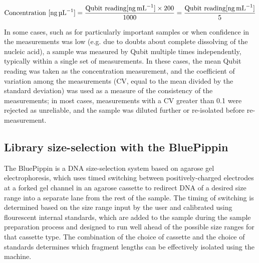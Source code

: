 \begin{equation}
\mathrm{Concentration~[\ngul{}]} = \frac{\mathrm{Qubit~reading [\ngml{}]} \times 200}{1000} = \frac{\mathrm{Qubit~reading [\ngml{}]}}{5}
\end{equation}

In some cases, such as for particularly important samples or when confidence in the measurements was low (e.g. due to doubts about complete dissolving of the nucleic acid), a sample was measured by Qubit multiple times independently, typically within a single set of measurements. In these cases, the mean Qubit reading was taken as the concentration measurement, and the coefficient of variation among the measurements (CV, equal to the mean divided by the standard deviation) was used as a measure of the consistency of the measurements; in most cases, measurements with a CV greater than 0.1 %
were rejected as unreliable, and the sample was diluted further or re-isolated before re-measurement.

\subsection{Library size-selection with the BluePippin}
\label{sec:methods_molec_standard_bluepippin}


The BluePippin is a DNA size-selection system based on agarose gel electrophoresis, which uses timed switching between positively-charged electrodes at a forked gel channel in an agarose cassette to redirect DNA of a desired size range into a separate lane from the rest of the sample. %
The timing of switching is determined based on the size range input by the user and calibrated using flourescent internal standards, which are added to the sample during the sample preparation process and designed to run well ahead of the possible size ranges for that cassette type. The combination of the choice of cassette and the choice of standards determines which fragment lengths can be effectively isolated using the machine.

